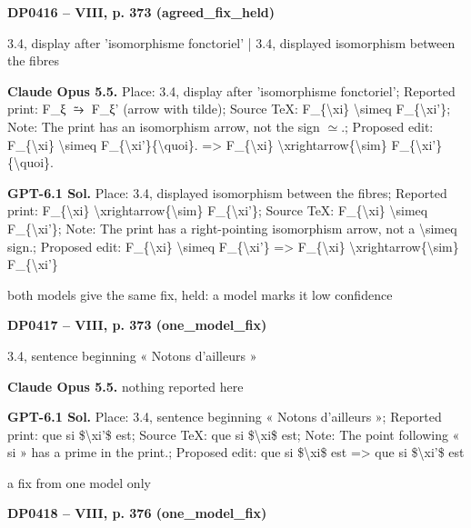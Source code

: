 \par\noindent\hypertarget{DP0416}{}\textbf{DP0416 -- VIII, p. 373 (agreed\_fix\_held)}\par
3.4, display after 'isomorphisme fonctoriel' | 3.4, displayed isomorphism between the fibres\par
\textbf{Claude Opus 5.5.} Place: 3.4, display after 'isomorphisme fonctoriel'; Reported print: F\_ξ \ensuremath{⥲} F\_ξ' (arrow with tilde); Source TeX: F\_\{\textbackslash{}xi\} \textbackslash{}simeq F\_\{\textbackslash{}xi'\}; Note: The print has an isomorphism arrow, not the sign \ensuremath{\simeq}.; Proposed edit: F\_\{\textbackslash{}xi\} \textbackslash{}simeq F\_\{\textbackslash{}xi'\}\{\textbackslash{}quoi\}. =\allowbreak > F\_\{\textbackslash{}xi\} \textbackslash{}xrightarrow\{\textbackslash{}sim\} F\_\{\textbackslash{}xi'\}\{\textbackslash{}quoi\}.\par
\textbf{GPT-6.1 Sol.} Place: 3.4, displayed isomorphism between the fibres; Reported print: F\_\{\textbackslash{}xi\} \textbackslash{}xrightarrow\{\textbackslash{}sim\} F\_\{\textbackslash{}xi'\}; Source TeX: F\_\{\textbackslash{}xi\} \textbackslash{}simeq F\_\{\textbackslash{}xi'\}; Note: The print has a right-pointing isomorphism arrow, not a \textbackslash{}simeq sign.; Proposed edit: F\_\{\textbackslash{}xi\} \textbackslash{}simeq F\_\{\textbackslash{}xi'\} =\allowbreak > F\_\{\textbackslash{}xi\} \textbackslash{}xrightarrow\{\textbackslash{}sim\} F\_\{\textbackslash{}xi'\}\par
both models give the same fix, held: a model marks it low confidence\par
\par\noindent\hypertarget{DP0417}{}\textbf{DP0417 -- VIII, p. 373 (one\_model\_fix)}\par
3.4, sentence beginning « Notons d'ailleurs »\par
\textbf{Claude Opus 5.5.} nothing reported here\par
\textbf{GPT-6.1 Sol.} Place: 3.4, sentence beginning « Notons d'ailleurs »; Reported print: que si \$\textbackslash{}xi'\$ est; Source TeX: que si \$\textbackslash{}xi\$ est; Note: The point following « si » has a prime in the print.; Proposed edit: que si \$\textbackslash{}xi\$ est =\allowbreak > que si \$\textbackslash{}xi'\$ est\par
a fix from one model only\par
\par\noindent\hypertarget{DP0418}{}\textbf{DP0418 -- VIII, p. 376 (one\_model\_fix)}\par
